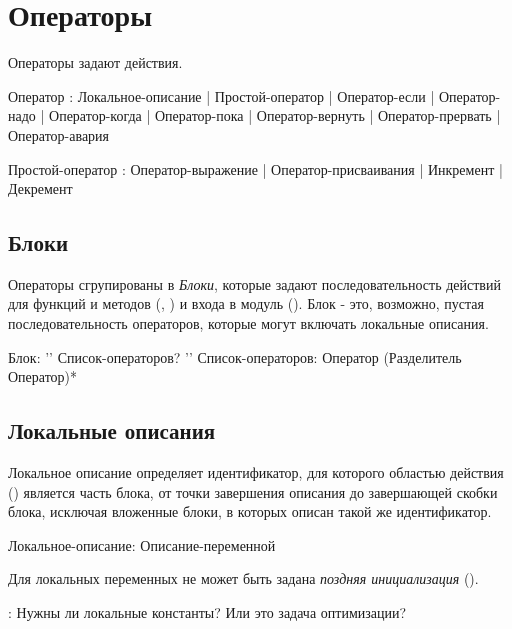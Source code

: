 \hypertarget{statements}{%
\section{Операторы}\label{stmt:chapter}}

Операторы задают действия.

\begin{Grammar}
Оператор
    : Локальное-описание
    | Простой-оператор
    | Оператор-если
    | Оператор-надо
    | Оператор-когда
    | Оператор-пока
    | Оператор-вернуть
    | Оператор-прервать
    | Оператор-авария

Простой-оператор
    : Оператор-выражение 
    | Оператор-присваивания
    | Инкремент 
    | Декремент
\end{Grammar}

\hypertarget{blocks}{%
\subsection{Блоки}\label{stmt:blocks}}

Операторы сгрупированы в \emph{Блоки}, которые задают последовательность действий для функций и методов (, ) и входа в модуль ().
Блок - это, возможно, пустая последовательность операторов, которые могут включать локальные описания.


\begin{Grammar}
Блок: '{' Список-операторов? '}'
Список-операторов: Оператор (Разделитель Оператор)* 
\end{Grammar}

\hypertarget{local-decls}{%
\subsection{Локальные описания}\label{stmt:local-decls}}

Локальное описание определяет идентификатор, для которого областью действия () является часть блока, 
от точки завершения описания до завершающей скобки блока, исключая вложенные блоки, в которых описан такой же идентификатор.

\begin{Grammar}
Локальное-описание: Описание-переменной
\end{Grammar}

Для локальных переменных не может быть задана \emph{поздняя инициализация} ().

\TBD: Нужны ли локальные константы? Или это задача оптимизации?


